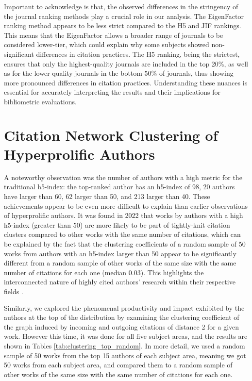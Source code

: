 Important to acknowledge is that, the observed differences in the stringency of the journal ranking methods
play a crucial role in our analysis. The EigenFactor ranking method appears to
be less strict compared to the H5 and JIF rankings. This means that the
EigenFactor allows a broader range of journals to be considered lower-tier,
which could explain why some subjects showed non-significant differences in
citation practices. The H5 ranking, being the strictest, ensures that only the
highest-quality journals are included in the top 20\%, as well as for the lower
quality journals in the bottom 50\% of journals, thus showing more pronounced
differences in citation practices. Understanding these nuances is essential for
accurately interpreting the results and their implications for bibliometric
evaluations.

\section{Citation Network Clustering of Hyperprolific Authors}

A noteworthy observation was the number of authors with a high metric for the
traditional h5-index: the top-ranked author has an h5-index of 98, 20 authors
have larger than 60, 62 larger than 50, and 213 larger than 40. These
achievements appear to be even more difficult to explain than earlier %
observations of hyperprolific authors. It was found in 2022 that works by
authors with a high h5-index (greater than 50) are more likely to be part of
tightly-knit citation clusters compared to other works with the same number of
citations, which can be explained by the fact that the clustering coefficients
of a random sample of 50 works from authors with an h5-index larger than 50
appear to be significantly different from a random sample of other works of the
same size with the same number of citations for each one (median 0.03). This
highlights the interconnected nature of highly cited authors' research within
their respective fields \cite{Spi23g}.

Similarly, we explored the phenomenal productivity and impact exhibited by the
authors at the top of the distribution by examining the clustering coefficient
of the graph induced by incoming and outgoing citations of distance 2 for a
given work. However this time, it was done for all five subject areas, and the
results are shown in Tables \ref{tab:clustering_top_random}. In more detail, we
used a random sample of 50 works from the top 15 authors of each subject area,
meaning we got 50 works from each subject area, and compared them to a random
sample of other works of the same size with the same number of citations for
each one. %

